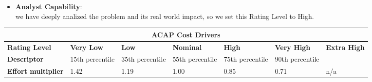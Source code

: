 \begin{itemize}
\item \textbf{Analyst Capability}:\\
we have deeply analized the problem and its real world impact, so we set this Rating Level to High.
\end{itemize}
\hspace*{-3cm}\begin{tabular}{|p{3cm}|p{2cm}|p{2cm}|p{2cm}|p{2cm}|p{2cm}|p{2cm}|}
\hline
\multicolumn{7}{|c|}{\textbf{ACAP Cost Drivers}}\\
\hline
\hline
\textbf{Rating Level} & \textbf{Very Low} & \textbf{Low} & \textbf{Nominal} & \textbf{High} & \textbf{Very High} & \textbf{Extra High}\\
\hline
\textbf{Descriptor} & 15th percentile & 35th percentile & 55th percentile & 75th percentile & 90th percentile & \\
\hline
\textbf{Effort multiplier} & 1.42 & 1.19 & 1.00 & 0.85 & 0.71 & n/a\\
\hline 
\end{tabular}